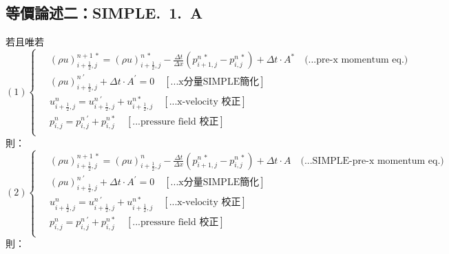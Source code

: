 \documentclass[12pt]{article}
\begin{document}
\subsection{等價論述二：SIMPLE.\ 1.\ A}
\label{1.A.e}
\noindent 若且唯若\\
\begin{equation}
(1)
\left\{
\begin{aligned}
    \ &(\rho u)_{i+\frac{1}{2},j}^{n+1\ *} = (\rho u)_{i+\frac{1}{2},j}^{n\ *} - \frac{\Delta t}{\Delta x}(p_{i+1,j}^{n\ *} - p_{i,j}^{n\ *}) + \Delta t \cdot A^{*}  \quad \text{(...pre-x momentum eq.)}\\[1.5ex]
    \ &(\rho u)_{i+\frac{1}{2},j}^{n\ \prime} + \Delta t \cdot A^{\prime} = 0\quad \left[\text{...x分量SIMPLE簡化}\right]\\[1.5ex]
    \ &u_{i+\frac{1}{2},j}^{n} = u_{i+\frac{1}{2},j}^{n\ '} + u_{i+\frac{1}{2},j}^{n *}  \quad \left[\text{...x-velocity 校正}\right]\\[1.5ex]
    \ &p_{i,j}^{n} = p_{i,j}^{n\ '} + p_{i,j}^{n *} \quad\left[\text{...pressure field 校正}\right]\\[1.5ex]
\end{aligned}
\right.
\end{equation}
\noindent 則：
\begin{equation}
(2)
\left\{
\begin{aligned}
    \ &(\rho u)_{i+\frac{1}{2},j}^{n+1\ *} = (\rho u)_{i+\frac{1}{2},j}^{n} - \frac{\Delta t}{\Delta x}(p_{i+1,j}^{n\ *} - p_{i,j}^{n\ *}) + \Delta t \cdot A  \quad \text{(...SIMPLE-pre-x momentum eq.)}\\[1.5ex]
    \ &(\rho u)_{i+\frac{1}{2},j}^{n\ \prime} + \Delta t \cdot A^{\prime} = 0\quad \left[\text{...x分量SIMPLE簡化}\right]\\[1.5ex]
    \ &u_{i+\frac{1}{2},j}^{n} = u_{i+\frac{1}{2},j}^{n\ '} + u_{i+\frac{1}{2},j}^{n *}  \quad \left[\text{...x-velocity 校正}\right]\\[1.5ex]
    \ &p_{i,j}^{n} = p_{i,j}^{n\ '} + p_{i,j}^{n *} \quad\left[\text{...pressure field 校正}\right]\\[1.5ex]
\end{aligned}
\right.
\end{equation}
\noindent 則：
\end{document}
